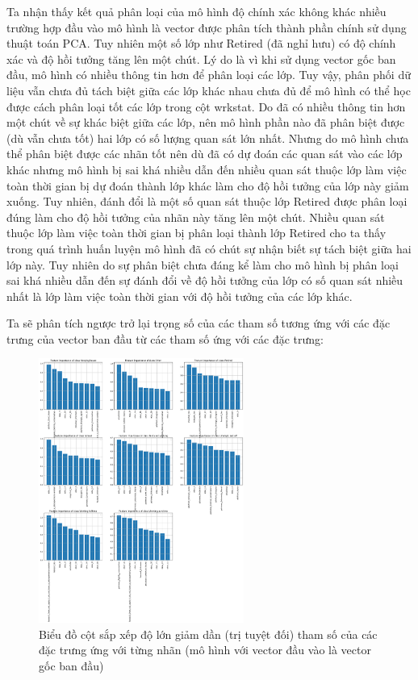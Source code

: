 \begin{enumerate}[label=(\alph*)]
    Ta nhận thấy kết quả phân loại của mô hình độ chính xác không khác nhiều trường hợp đầu vào mô hình là vector được phân tích thành phần chính sử dụng thuật toán PCA.
    Tuy nhiên một số lớp như Retired (đã nghỉ hưu) có độ chính xác và độ hồi tưởng tăng lên một chút.
    Lý do là vì khi sử dụng vector gốc ban đầu, mô hình có nhiều thông tin hơn để phân loại các lớp.
    Tuy vậy, phân phối dữ liệu vẫn chưa đủ tách biệt giữa các lớp khác nhau chưa đủ để mô hình có thể học được cách phân loại tốt các lớp trong cột wrkstat.
    Do đã có nhiều thông tin hơn một chút về sự khác biệt giữa các lớp, nên mô hình phần nào đã phân biệt được (dù vẫn chưa tốt) hai lớp có số lượng quan sát lớn nhất.
    Nhưng do mô hình chưa thể phân biệt được các nhãn tốt nên dù đã có dự đoán các quan sát vào các lớp khác nhưng mô hình bị sai khá nhiều dẫn đến nhiều quan sát thuộc lớp làm việc toàn thời gian bị dự đoán thành lớp khác làm cho độ hồi tưởng của lớp này giảm xuống.
    Tuy nhiên, đánh đổi là một số quan sát thuộc lớp Retired được phân loại đúng làm cho độ hồi tưởng của nhãn này tăng lên một chút.
    Nhiều quan sát thuộc lớp làm việc toàn thời gian bị phân loại thành lớp Retired cho ta thấy trong quá trình huấn luyện mô hình đã có chút sự nhận biết sự tách biệt giữa hai lớp này.
    Tuy nhiên do sự phân biệt chưa đáng kể làm cho mô hình bị phân loại sai khá nhiều dẫn đến sự đánh đổi về độ hồi tưởng của lớp có số quan sát nhiều nhất là lớp làm việc toàn thời gian với độ hồi tưởng của các lớp khác.

    Ta sẽ phân tích ngược trở lại trọng số của các tham số tương ứng với các đặc trưng của vector ban đầu từ các tham số ứng với các đặc trưng:

    \begin{figure}[H]
        \centering
        \includegraphics[width=0.6\textwidth]{figures/Thanh/Models/Logistic/Non_null_models_Feature_Importance_Logistic_original_features.png}
        \caption{Biểu đồ cột sắp xếp độ lớn giảm dần (trị tuyệt đối) tham số của các đặc trưng ứng với từng nhãn (mô hình với vector đầu vào là vector gốc ban đầu)}
        \label{fig:Non_null_models_Feature_Importance_Logistic_original_features}
    \end{figure}


\end{enumerate}
